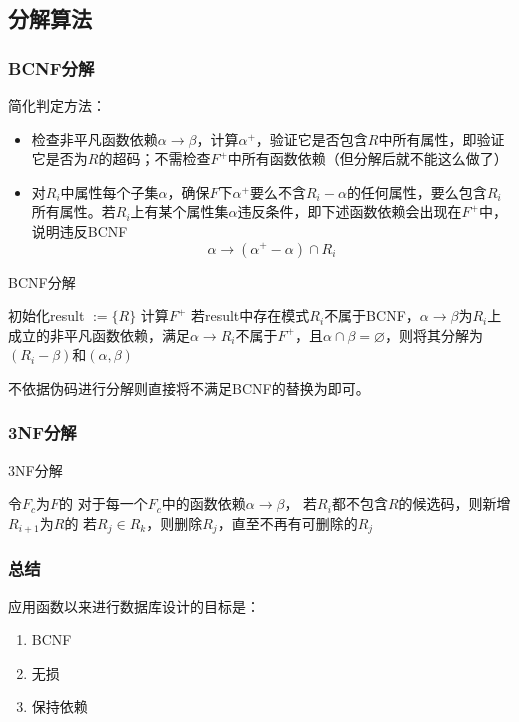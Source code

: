 \subsection{分解算法}
\subsubsection{BCNF分解}
简化判定方法：
\begin{itemize}
	\item 检查非平凡函数依赖$\alpha\to\beta$，计算$\alpha^+$，验证它是否包含$R$中所有属性，即验证它是否为$R$的超码；不需检查$F^+$中所有函数依赖（但分解后就不能这么做了）
	\item 对$R_i$中属性每个子集$\alpha$，确保$F$下$\alpha^+$要么不含$R_i-\alpha$的任何属性，要么包含$R_i$所有属性。若$R_i$上有某个属性集$\alpha$违反条件，即下述函数依赖会出现在$F^+$中，说明违反BCNF
	\[\alpha\to(\alpha^+-\alpha)\cap R_i\]
\end{itemize}
\begin{algorithm}
\caption{BCNF分解}
\begin{algorithmic}[1]
\State 初始化result $:=\{R\}$
\State 计算$F^+$
\State 若result中存在模式$R_i$不属于BCNF，$\alpha\to\beta$为$R_i$上成立的非平凡函数依赖，满足$\alpha\to R_i$不属于$F^+$，且$\alpha\cap\beta=\varnothing$，则将其分解为$(R_i-\beta)$和$(\alpha,\beta)$
\end{algorithmic}
\end{algorithm}

不依据伪码进行分解则直接将不满足BCNF的替换为即可。

\subsubsection{3NF分解}
\begin{algorithm}
\caption{3NF分解}
\begin{algorithmic}[1]
\State 令$F_c$为$F$的
\State 对于每一个$F_c$中的函数依赖$\alpha\to\beta$，
\State 若$R_i$都不包含$R$的候选码，则新增$R_{i+1}$为$R$的
\State 若$R_j\in R_k$，则删除$R_j$，直至不再有可删除的$R_j$
\end{algorithmic}
\end{algorithm}

\subsubsection{总结}
应用函数以来进行数据库设计的目标是：
\begin{enumerate}
	\item BCNF
	\item 无损
	\item 保持依赖
\end{enumerate}

